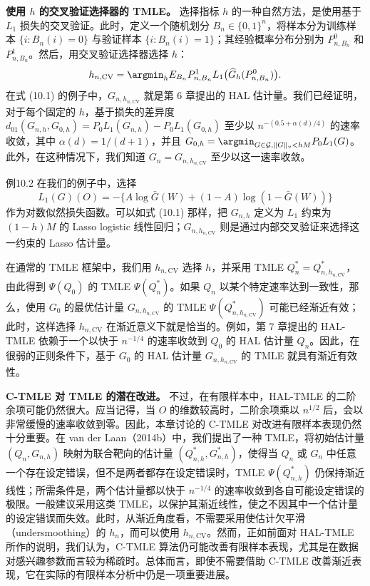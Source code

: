 \noindent\textbf{使用 $h$ 的交叉验证选择器的 TMLE。}
选择指标 $h$ 的一种自然方法，是使用基于 $L_1$ 损失的交叉验证。此时，定义一个随机划分 $B_n\in\{0,1\}^n$，将样本分为训练样本 $\{i:B_n(i)=0\}$ 与验证样本 $\{i:B_n(i)=1\}$；其经验概率分布分别为 $P_{n,B_n}^0$ 和 $P_{n,B_n}^1$。然后，用交叉验证选择器选择 $h$：
\[
 h_{n,\mathrm{CV}}
 =\argmin_h E_{B_n}P_{n,B_n}^1L_1\bigl(\widehat G_h(P_{n,B_n}^0)\bigr).
\]
在式 (10.1) 的例子中，$G_{n,h_{n,\mathrm{CV}}}$ 就是第 6 章提出的 HAL 估计量。我们已经证明，对于每个固定的 $h$，基于损失的差异度
$d_{01}(G_{n,h},G_{0,h})=P_0L_1(G_{n,h})-P_0L_1(G_{0,h})$
至少以 $n^{-(0.5+\alpha(d)/4)}$ 的速率收敛，其中
$\alpha(d)=1/(d+1)$，并且
$G_{0,h}=\argmin_{G\in\mathcal G,\|G\|_v<hM}P_0L_1(G)$。
此外，在这种情况下，我们知道 $G_n=G_{n,h_{n,\mathrm{CV}}}$ 至少以这一速率收敛。

\begin{bookresult}{例}{10.2}
在我们的例子中，选择
\[
 L_1(G)(O)
 =-\{A\log\bar G(W)+(1-A)\log(1-\bar G(W))\}
\]
作为对数似然损失函数。可以如式 (10.1) 那样，把 $G_{n,h}$ 定义为 $L_1$ 约束为 $(1-h)M$ 的 Lasso logistic 线性回归；$G_{n,h_{n,\mathrm{CV}}}$ 则是通过内部交叉验证来选择这一约束的 Lasso 估计量。
\end{bookresult}

在通常的 TMLE 框架中，我们用 $h_{n,\mathrm{CV}}$ 选择 $h$，并采用 TMLE
$Q_n^*=Q_{n,h_{n,\mathrm{CV}}}^*$，
由此得到 $\Psi(Q_0)$ 的 TMLE $\Psi(Q_n^*)$。如果 $Q_n$ 以某个特定速率达到一致性，那么，使用 $G_0$ 的最优估计量 $G_{n,h_{n,\mathrm{CV}}}$ 的 TMLE
$\Psi(Q_{n,h_{n,\mathrm{CV}}}^*)$
可能已经渐近有效；此时，这样选择 $h_{n,\mathrm{CV}}$ 在渐近意义下就是恰当的。例如，第 7 章提出的 HAL-TMLE 依赖于一个以快于 $n^{-1/4}$ 的速率收敛到 $Q_0$ 的 HAL 估计量 $Q_n$。因此，在很弱的正则条件下，基于 $G_0$ 的 HAL 估计量 $G_{n,h_{n,\mathrm{CV}}}$ 的 TMLE 就具有渐近有效性。

\noindent\textbf{C-TMLE 对 TMLE 的潜在改进。}
不过，在有限样本中，HAL-TMLE 的二阶余项可能仍然很大。应当记得，当 $O$ 的维数较高时，二阶余项乘以 $n^{1/2}$ 后，会以非常缓慢的速率收敛到零。因此，本章讨论的 C-TMLE 对改进有限样本表现仍然十分重要。在 van der Laan（2014b）中，我们提出了一种 TMLE，将初始估计量 $(Q_n,G_{n,h})$ 映射为联合靶向的估计量 $(Q_{n,h}^*,G_{n,h}^*)$，使得当 $Q_n$ 或 $G_n$ 中任意一个存在设定错误，但不是两者都存在设定错误时，TMLE $\Psi(Q_{n,h}^*)$ 仍保持渐近线性；所需条件是，两个估计量都以快于 $n^{-1/4}$ 的速率收敛到各自可能设定错误的极限。一般建议采用这类 TMLE，以保护其渐近线性，使之不因其中一个估计量的设定错误而失效。此时，从渐近角度看，不需要采用使估计欠平滑（undersmoothing）的 $h_n$，而可以使用 $h_{n,\mathrm{CV}}$。然而，正如前面对 HAL-TMLE 所作的说明，我们认为，C-TMLE 算法仍可能改善有限样本表现，尤其是在数据对感兴趣参数而言较为稀疏时。总体而言，即使不需要借助 C-TMLE 改善渐近表现，它在实际的有限样本分析中仍是一项重要进展。

